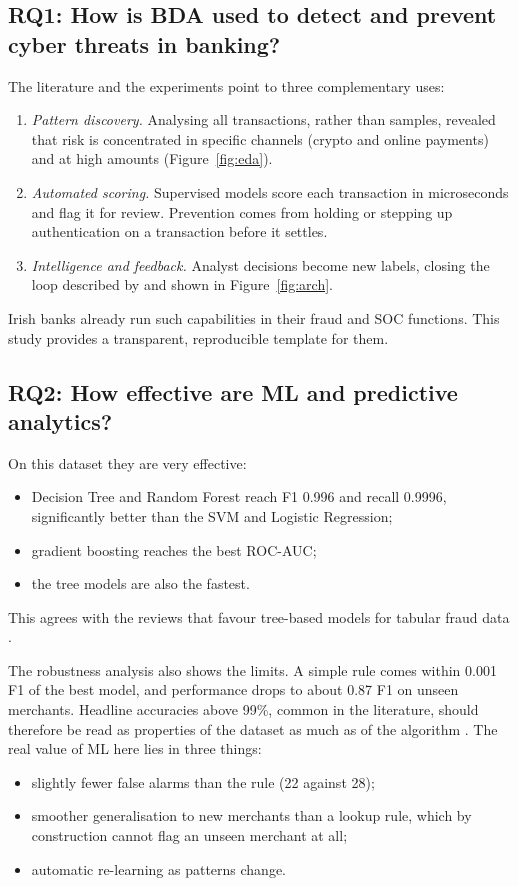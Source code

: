 \documentclass[12pt,a4paper]{article}
\begin{document}
\subsection{RQ1: How is BDA used to detect and prevent cyber threats in banking?}
The literature and the experiments point to three complementary uses:
\begin{enumerate}[label=(\alph*)]
\item \emph{Pattern discovery.} Analysing all transactions, rather than samples, revealed that risk is concentrated in specific channels (crypto and online payments) and at high amounts (Figure~\ref{fig:eda}).
\item \emph{Automated scoring.} Supervised models score each transaction in microseconds and flag it for review. Prevention comes from holding or stepping up authentication on a transaction before it settles.
\item \emph{Intelligence and feedback.} Analyst decisions become new labels, closing the loop described by \citet{montasari2020application} and shown in Figure~\ref{fig:arch}.
\end{enumerate}
Irish banks already run such capabilities in their fraud and SOC functions. This study provides a transparent, reproducible template for them.

\subsection{RQ2: How effective are ML and predictive analytics?}
On this dataset they are very effective:
\begin{itemize}[nosep]
\item Decision Tree and Random Forest reach F1 0.996 and recall 0.9996, significantly better than the SVM and Logistic Regression;
\item gradient boosting reaches the best ROC-AUC;
\item the tree models are also the fastest.
\end{itemize}
This agrees with the reviews that favour tree-based models for tabular fraud data \citep{ali2022financial, naeem2026mlfraud}.

The robustness analysis also shows the limits. A simple rule comes within 0.001 F1 of the best model, and performance drops to about 0.87 F1 on unseen merchants. Headline accuracies above 99\%, common in the literature, should therefore be read as properties of the dataset as much as of the algorithm \citep{ring2019survey}. The real value of ML here lies in three things:
\begin{itemize}[nosep]
\item slightly fewer false alarms than the rule (22 against 28);
\item smoother generalisation to new merchants than a lookup rule, which by construction cannot flag an unseen merchant at all;
\item automatic re-learning as patterns change.
\end{itemize}
\end{document}
